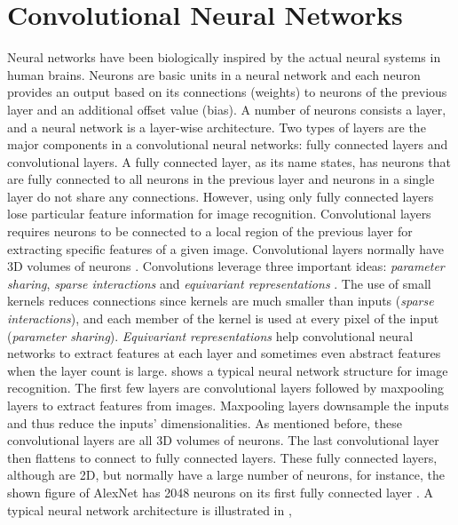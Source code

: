 \documentclass[a4paper,12pt]{report}
\begin{document}
\section{Convolutional Neural Networks}
Neural networks have been biologically inspired by the actual neural systems in
human brains.
Neurons are basic units in a neural network and each neuron provides an output
based on its connections (weights) to neurons of the previous layer and an additional
offset value (bias).
A number of neurons consists a layer, and a neural network
is a layer-wise architecture.
Two types of layers are the major components in a convolutional neural networks:
fully connected layers and convolutional layers.
A fully connected layer, as its name states, has neurons that are fully connected
to all neurons in the previous layer and neurons in a single layer do not share
any connections.
However, using only fully connected layers lose particular feature information for image
recognition.
Convolutional layers requires neurons to be connected to a local region of the
previous layer for extracting specific features of a given image.
Convolutional layers normally have 3D volumes of neurons \cite{Krizhevsky}.
Convolutions leverage three important ideas: \textit{parameter sharing}, \textit{sparse interactions}
and \textit{equivariant representations} \cite{Goodfellow-et-al-2016}.
The use of small kernels reduces connections since kernels are much smaller than
inputs (\textit{sparse interactions}), and each member of the kernel is used
at every pixel of the input (\textit{parameter sharing}).
\textit{Equivariant representations} help convolutional neural networks to extract
features at each layer and sometimes even abstract features when the layer count is large.
 shows a typical neural network structure for image recognition.
The first few layers are convolutional layers followed by maxpooling layers to
extract features from images.
Maxpooling layers downsample the inputs and thus reduce the inputs' dimensionalities.
As mentioned before, these convolutional layers are all 3D volumes of neurons.
The last convolutional layer then flattens to connect to fully connected layers.
These fully connected layers, although are 2D, but normally have a large number
of neurons, for instance, the shown figure of AlexNet has 2048 neurons on its
first fully connected layer \cite{Krizhevsky}.
A typical neural network architecture is illustrated in ,
\end{document}

